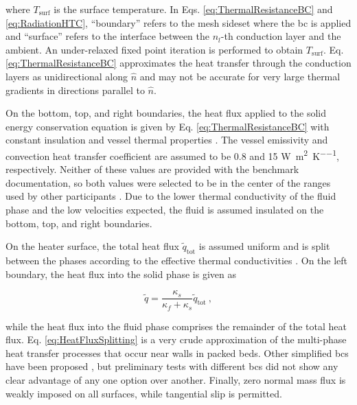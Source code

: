 \noindent where \(T_\text{surf}\) is the surface temperature. In Eqs. \eqref{eq:ThermalResistanceBC} and \eqref{eq:RadiationHTC}, ``boundary'' refers to the mesh sideset where the \gls{bc} is applied and ``surface'' refers to the interface between the \(n_l\)-th conduction layer and the ambient. An under-relaxed fixed point iteration is performed to obtain \(T_\text{surf}\). Eq. \eqref{eq:ThermalResistanceBC} approximates the heat transfer through the conduction layers as unidirectional along \(\hat{n}\) and may not be accurate for very large thermal gradients in directions parallel to \(\hat{n}\).

On the bottom, top, and right boundaries, the heat flux applied to the solid energy conservation equation is given by Eq. \eqref{eq:ThermalResistanceBC} with constant insulation and vessel thermal properties \cite{SANA}. The vessel emissivity and convection heat transfer coefficient are assumed to be 0.8 and 15 \si{\watt\per\square\meter\per\kelvin}, respectively. Neither of these values are provided with the benchmark documentation, so both values were selected to be in the center of the ranges used by other participants \cite{rousseau,baggemann,becker2003,lim,tecdoc1163}. Due to the lower thermal conductivity of the fluid phase and the low velocities expected, the fluid is assumed insulated on the bottom, top, and right boundaries.

On the heater surface, the total heat flux \(\tilde{q}_\text{tot}\) is assumed uniform and is split between the phases according to the effective thermal conductivities \cite{alazmi}. On the left boundary, the heat flux into the solid phase is given as

\begin{equation}
\label{eq:HeatFluxSplitting}
\tilde{q}=\frac{\kappa_s}{\kappa_f+\kappa_s} \tilde{q}_\text{tot}\ ,
\end{equation}

\noindent while the heat flux into the fluid phase comprises the remainder of the total heat flux. Eq. \eqref{eq:HeatFluxSplitting} is a very crude approximation of the multi-phase heat transfer processes that occur near walls in packed beds. Other simplified \glspl{bc} have been proposed \cite{alazmi}, but preliminary tests with different \glspl{bc} did not show any clear advantage of any one option over another. Finally, zero normal mass flux is weakly imposed on all surfaces, while tangential slip is permitted. 


